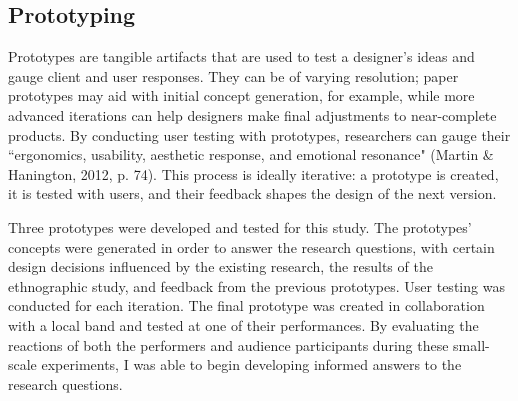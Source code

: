 \subsection{Prototyping}
Prototypes are tangible artifacts that are used to test a designer's ideas and gauge client and user responses. They can be of varying resolution; paper prototypes may aid with initial concept generation, for example, while more advanced iterations can help designers make final adjustments to near-complete products. By conducting user testing with prototypes, researchers can gauge their ``ergonomics, usability, aesthetic response, and emotional resonance" (Martin \& Hanington, 2012, p. 74).  This process is ideally iterative: a prototype is created, it is tested with users, and their feedback shapes the design of the next version.

Three prototypes were developed and tested for this study. The prototypes' concepts were generated in order to answer the research questions, with certain design decisions influenced by the existing research, the results of the ethnographic study, and feedback from the previous prototypes. User testing was conducted for each iteration. The final prototype was created in collaboration with a local band and tested at one of their performances. By evaluating the reactions of both the performers and audience participants during these small-scale experiments, I was able to begin developing informed answers to the research questions.
